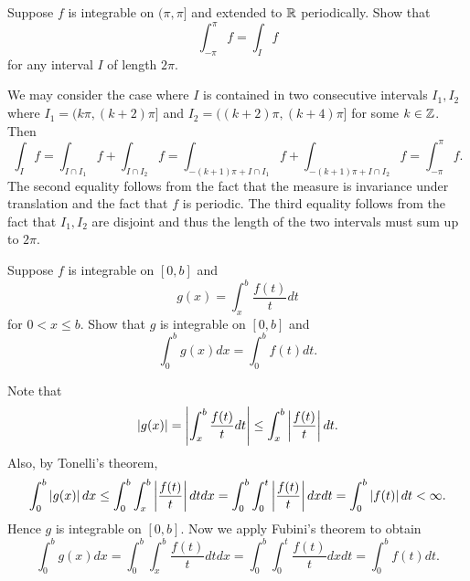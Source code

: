 \begin{exercise}
    Suppose $f$ is integrable on $(\pi,\pi]$ and extended to $\mathbb{R}$ periodically. 
    Show that 
    \begin{equation*}
        \int_{-\pi}^{\pi} f = \int_I f
    \end{equation*}
    for any interval $I$ of length $2\pi$.
\end{exercise}
\begin{pf}
    We may consider the case where $I$ is contained in two consecutive 
    intervals $I_1,I_2$ where $I_1 = (k\pi,(k+2)\pi]$ and $I_2 = 
    ((k+2)\pi,(k+4)\pi]$ for some $k\in\mathbb{Z}$. Then 
    \begin{equation*}
        \int_I f = \int_{I\cap I_1} f + \int_{I\cap I_2} f 
        = \int_{-(k+1)\pi + I\cap I_1} f + \int_{-(k+1)\pi + I\cap I_2} f
        = \int_{-\pi}^{\pi} f.
    \end{equation*}
    The second equality follows from the fact that the measure is invariance 
    under translation and the fact that $f$ is periodic. The third equality 
    follows from the fact that $I_1,I_2$ are disjoint and thus the length of 
    the two intervals must sum up to $2\pi$. 
\end{pf}

\begin{exercise}
    Suppose $f$ is integrable on $[0,b]$ and 
    \begin{equation*}
        g(x) = \int_{x}^{b} \frac{f(t)}{t}dt
    \end{equation*}
    for $0<x\leq b$. Show that $g$ is integrable on $[0,b]$ and 
    \begin{equation*}
        \int_{0}^{b} g(x)dx = \int_{0}^{b} f(t)dt.
    \end{equation*}
\end{exercise}
\begin{pf}
    Note that 
    \begin{equation*}
        \left\lvert {g(x)} \right\rvert = \left\lvert {\int_{x}^{b} \frac{f(t)}{t}dt} \right\rvert 
        \leq \int_{x}^{b} \left\lvert {\frac{f(t)}{t}} \right\rvert dt.
    \end{equation*}
    Also, by Tonelli's theorem,
    \begin{equation*}
        \int_{0}^{b} \left\lvert {g(x)} \right\rvert dx \leq \int_{0}^{b} \int_{x}^{b} \left\lvert {\frac{f(t)}{t}} \right\rvert dtdx 
        = \int_{0}^{b} \int_{0}^{t} \left\lvert {\frac{f(t)}{t}} \right\rvert dxdt = \int_{0}^{b} \left\lvert {f(t)} \right\rvert dt 
        < \infty.
    \end{equation*}
    Hence $g$ is integrable on $[0,b]$. Now we apply Fubini's theorem to obtain 
    \begin{equation*}
        \int_{0}^{b} g(x)dx = \int_{0}^{b} \int_{x}^{b} \frac{f(t)}{t}dtdx 
        = \int_{0}^{b} \int_{0}^{t} \frac{f(t)}{t}dxdt = \int_{0}^{b} f(t)dt.
    \end{equation*}
\end{pf}

